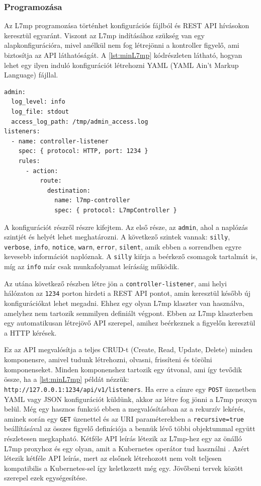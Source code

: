 \subsubsection{Programozása}

Az L7mp programozása történhet konfigurációs fájlból és REST API hívásokon keresztül
egyaránt. Viszont az L7mp indításához szükség van egy alapkonfigurációra, mivel
anélkül nem fog létrejönni a kontroller figyelő, ami biztosítja az API 
láthatóságát. A \ref{lst:minL7mp} kódrészleten látható, hogyan lehet egy ilyen induló 
konfigurációt létrehozni YAML (YAML Ain't Markup Language) fájllal.

\begin{lstlisting}[caption=L7mp minimális konfiguráció, label=lst:minL7mp]
admin:
  log_level: info
  log_file: stdout
  access_log_path: /tmp/admin_access.log
listeners:
  - name: controller-listener
    spec: { protocol: HTTP, port: 1234 }
    rules:
      - action:
          route:
            destination:
              name: l7mp-controller
              spec: { protocol: L7mpController }
\end{lstlisting}

A konfigurációt részről részre kifejtem. Az első része, az \texttt{admin}, ahol
a naplózás szintjét és helyét lehet meghatározni. A következő szintek vannak:
\texttt{silly}, \texttt{verbose}, \texttt{info}, \texttt{notice}, \texttt{warn}, 
\texttt{error}, \texttt{silent}, amik ebben a sorrendben egyre kevesebb információt 
naplóznak. A \texttt{silly} kiírja a beérkező csomagok  tartalmát is, míg az 
\texttt{info} már csak munkafolyamat leírásáig működik.

Az utána következő részben létre jön a \texttt{controller-listener}, ami helyi hálózaton 
az \texttt{1234} porton hirdeti a REST API pontot, amin keresztül később új 
konfigurációkat lehet megadni. Ehhez egy olyan L7mp klaszter van használva, amelyhez nem 
tartozik semmilyen definiált végpont. Ebben az L7mp klaszterben egy automatikusan 
létrejövő API szerepel, amihez beérkeznek a figyelőn keresztül a HTTP kérések. 

Ez az API megvalósítja a teljes CRUD-t (Create, Read, Update, Delete) minden
komponensre, amivel tudunk létrehozni, olvasni, frissíteni és törölni komponenseket. 
Minden komponenshez tartozik egy útvonal, ami így tevődik össze, ha a \ref{lst:minL7mp} 
példát nézzük: \texttt{http://127.0.0.1:1234/api/v1/listeners}. Ha erre a címre egy 
\texttt{POST} üzenetben YAML vagy JSON konfigurációt küldünk, akkor az létre fog jönni a 
L7mp proxyn belül. Még egy hasznos funkció ebben a megvalósításban az a rekurzív lekérés, 
aminek során egy \texttt{GET} üzenettel és az URI paraméterekben a 
\texttt{recursive=true} beállításával az összes figyelő definíciója a bennük lévő többi 
objektummal együtt részletesen megkapható. Kétféle  API leírás létezik az L7mp-hez egy az 
önálló L7mp proxyhoz \cite{proxy} és egy olyan, amit a Kubernetes operátor tud használni 
\cite{kubeProxy}. Azért létezik kétféle API leírás, mert az elsőnek létrehozott nem volt 
teljesen kompatibilis a Kubernetes-sel így keletkezett még egy. Jövőbeni tervek között 
szerepel ezek egységesítése.

